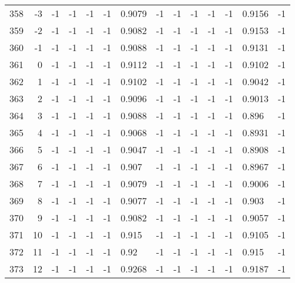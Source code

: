 \begin{table}[p]
{\begin{minipage}{\textheight}
\begin{tabular}{rr||lll|lll||lll|lll}
358    & -3   & -1      & -1      & -1     & -1     & 0.9079 & -1     & -1      & -1      & -1     & -1     & 0.9156 & -1     \\
359    & -2   & -1      & -1      & -1     & -1     & 0.9082 & -1     & -1      & -1      & -1     & -1     & 0.9153 & -1     \\
360    & -1   & -1      & -1      & -1     & -1     & 0.9088 & -1     & -1      & -1      & -1     & -1     & 0.9131 & -1     \\
361    & 0    & -1      & -1      & -1     & -1     & 0.9112 & -1     & -1      & -1      & -1     & -1     & 0.9102 & -1     \\
362    & 1    & -1      & -1      & -1     & -1     & 0.9102 & -1     & -1      & -1      & -1     & -1     & 0.9042 & -1     \\
363    & 2    & -1      & -1      & -1     & -1     & 0.9096 & -1     & -1      & -1      & -1     & -1     & 0.9013 & -1     \\
364    & 3    & -1      & -1      & -1     & -1     & 0.9088 & -1     & -1      & -1      & -1     & -1     & 0.896  & -1     \\
365    & 4    & -1      & -1      & -1     & -1     & 0.9068 & -1     & -1      & -1      & -1     & -1     & 0.8931 & -1     \\
366    & 5    & -1      & -1      & -1     & -1     & 0.9047 & -1     & -1      & -1      & -1     & -1     & 0.8908 & -1     \\
367    & 6    & -1      & -1      & -1     & -1     & 0.907  & -1     & -1      & -1      & -1     & -1     & 0.8967 & -1     \\
368    & 7    & -1      & -1      & -1     & -1     & 0.9079 & -1     & -1      & -1      & -1     & -1     & 0.9006 & -1     \\
369    & 8    & -1      & -1      & -1     & -1     & 0.9077 & -1     & -1      & -1      & -1     & -1     & 0.903  & -1     \\
370    & 9    & -1      & -1      & -1     & -1     & 0.9082 & -1     & -1      & -1      & -1     & -1     & 0.9057 & -1     \\
371    & 10   & -1      & -1      & -1     & -1     & 0.915  & -1     & -1      & -1      & -1     & -1     & 0.9105 & -1     \\
372    & 11   & -1      & -1      & -1     & -1     & 0.92   & -1     & -1      & -1      & -1     & -1     & 0.915  & -1     \\
373    & 12   & -1      & -1      & -1     & -1     & 0.9268 & -1     & -1      & -1      & -1     & -1     & 0.9187 & -1     \\

\end{tabular}
\end{minipage}}
\end{table}

